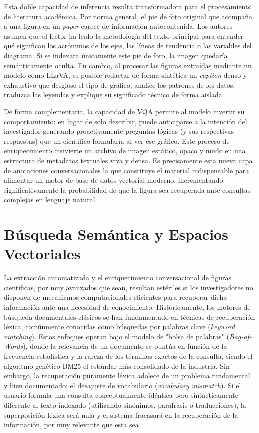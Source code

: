 \documentclass[a4paper]{report}
\begin{document}
Esta doble capacidad de inferencia resulta transformadora para el procesamiento de literatura académica. Por norma general, el pie de foto original que acompaña a una figura en un \textit{paper} carece de información autocontenida. Los autores asumen que el lector ha leído la metodología del texto principal para entender qué significan los acrónimos de los ejes, las líneas de tendencia o las variables del diagrama. Si se indexara únicamente este pie de foto, la imagen quedaría semánticamente oculta. En cambio, al procesar las figuras extraídas mediante un modelo como LLaVA, es posible redactar de forma sintética un \textit{caption} denso y exhaustivo que desglose el tipo de gráfico, analice los patrones de los datos, traduzca las leyendas y explique su significado técnico de forma aislada.

De forma complementaria, la capacidad de VQA permite al modelo invertir su comportamiento: en lugar de solo describir, puede anticiparse a la intención del investigador generando proactivamente preguntas lógicas (y sus respectivas respuestas) que un científico formularía al ver ese gráfico. Este proceso de enriquecimiento convierte un archivo de imagen estático, opaco y mudo en una estructura de metadatos textuales viva y densa. Es precisamente esta nueva capa de anotaciones conversacionales la que constituye el material indispensable para alimentar un motor de base de datos vectorial moderno, incrementando significativamente la probabilidad de que la figura sea recuperada ante consultas complejas en lenguaje natural.

\clearpage

\section{Búsqueda Semántica y Espacios Vectoriales}
\label{sec:estado_arte_busqueda}

La extracción automatizada y el enriquecimiento conversacional de figuras científicas, por muy avanzados que sean, resultan estériles si los investigadores no disponen de mecanismos computacionales eficientes para recuperar dicha información ante una necesidad de conocimiento. Históricamente, los motores de búsqueda documentales clásicos se han fundamentado en técnicas de recuperación léxica, comúnmente conocidas como búsquedas por palabras clave (\textit{keyword matching}). Estos enfoques operan bajo el modelo de "bolsa de palabras" (\textit{Bag-of-Words}), donde la relevancia de un documento se puntúa en función de la frecuencia estadística y la rareza de los términos exactos de la consulta, siendo el algoritmo genético BM25 el estándar más consolidado de la industria. Sin embargo, la recuperación puramente léxica adolece de un problema fundamental y bien documentado: el desajuste de vocabulario (\textit{vocabulary mismatch}). Si el usuario formula una consulta conceptualmente idéntica pero sintácticamente diferente al texto indexado (utilizando sinónimos, paráfrasis o traducciones), la superposición léxica será nula y el sistema fracasará en la recuperación de la información, por muy relevante que esta sea \cite{reimers2019sentence}.
\end{document}
